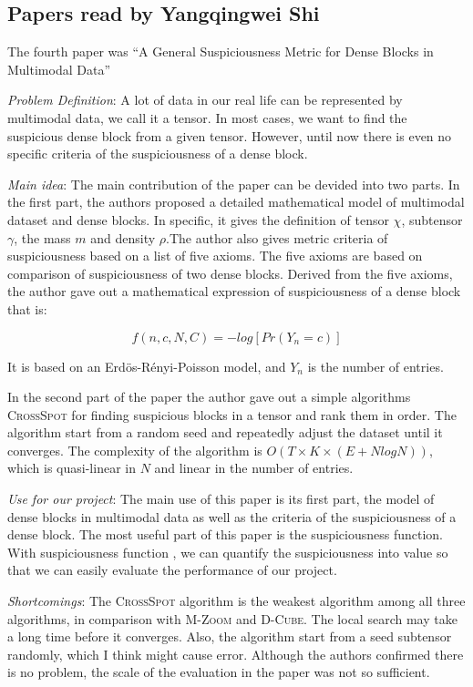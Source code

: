 \subsection{Papers read by Yangqingwei Shi}

The fourth paper was ``A General Suspiciousness Metric for Dense Blocks
in Multimodal Data''

\begin{itemize*}
\item {\em Problem Definition}: A lot of data in our real life can be represented by multimodal data, we call it a tensor. In most cases, we want to find the suspicious dense block from a given tensor. However, until now there is even no specific criteria of the suspiciousness of a dense block. \\

\item {\em Main idea}: The main contribution of the paper can be devided into two parts. In the first part, the authors proposed a detailed mathematical model of multimodal dataset and dense blocks. In specific, it gives the definition of tensor $\chi$, subtensor $\gamma$, the mass $m$ and density $\rho$.The author also gives metric criteria of suspiciousness based on a list of five axioms. The five axioms are based on comparison of suspiciousness of two dense blocks. Derived from the five axioms, the author gave out a mathematical expression of suspiciousness of a dense block that is:

 \[f(n, c, N, C) = -log[Pr(Y_n = c)] \]
 
It is based on an Erd\"{o}s-R\'{e}nyi-Poisson model, and $Y_n$ is the number of entries. 
 
In the second part of the paper the author gave out a simple algorithms \textsc{CrossSpot} for finding suspicious blocks in a tensor and rank them in order. The algorithm start from a random seed and repeatedly adjust the dataset until it converges. The complexity of the algorithm is $O(T\times K\times (E + N log N))$, which is quasi-linear in $N$ and linear in the number of entries. \\

\item {\em Use for our project}:
      The main use of this paper is its first part, the model of dense blocks in multimodal data as well as the criteria of the suspiciousness of a dense block. The most useful part of this paper is the suspiciousness function. With suspiciousness function , we can quantify the suspiciousness into value so that we can easily evaluate the performance of our project. \\
      
\item {\em Shortcomings}:
      The \textsc{CrossSpot} algorithm is the weakest algorithm among all three algorithms, in comparison with \textsc{M-Zoom} and \textsc{D-Cube}. The local search may take a long time before it converges. Also, the algorithm start from a seed subtensor randomly, which I think might cause error. Although the authors confirmed there is no problem, the scale of the evaluation in the paper was not so sufficient.
\end{itemize*}

